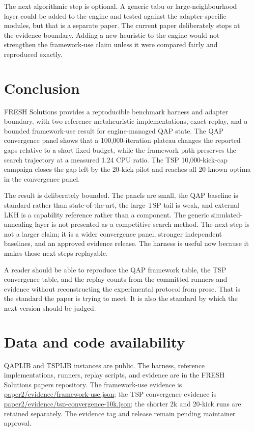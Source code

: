 \documentclass[11pt]{article}
\begin{document}
The next algorithmic step is optional. A generic tabu or large-neighbourhood layer could be added to
the engine and tested against the adapter-specific modules, but that is a separate paper. The current
paper deliberately stops at the evidence boundary. Adding a new heuristic to the engine would not
strengthen the framework-use claim unless it were compared fairly and reproduced exactly.

\section{Conclusion}

FRESH Solutions provides a reproducible benchmark harness and adapter boundary, with two reference
metaheuristic implementations, exact replay, and a bounded framework-use result for engine-managed
QAP state. The QAP convergence panel shows that a 100,000-iteration plateau changes the reported gaps
relative to a short fixed budget, while the framework path preserves the search trajectory at a
measured 1.24 CPU ratio. The TSP 10,000-kick-cap campaign closes the gap left by the 20-kick pilot and
reaches all 20 known optima in the convergence panel.

The result is deliberately bounded. The panels are small, the QAP baseline is standard rather than
state-of-the-art, the large TSP tail is weak, and external LKH is a capability reference rather than a
component. The generic simulated-annealing layer is not presented as a competitive search method. The
next step is not a larger claim; it is a wider convergence panel, stronger independent baselines, and
an approved evidence release. The harness is useful now because it makes those next steps replayable.

A reader should be able to reproduce the QAP framework table, the TSP convergence table, and the
replay counts from the committed runners and evidence without reconstructing the experimental
protocol from prose. That is the standard the paper is trying to meet. It is also the standard by
which the next version should be judged.

\section*{Data and code availability}
QAPLIB and TSPLIB instances are public. The harness, reference implementations, runners, replay
scripts, and evidence are in the FRESH Solutions papers repository. The framework-use evidence is
\url{paper2/evidence/framework-use.json}; the TSP convergence evidence is
\url{paper2/evidence/tsp-convergence-10k.json}; the shorter 2k and 20-kick runs are retained
separately.
The evidence tag and release remain pending maintainer approval.



\end{document}
